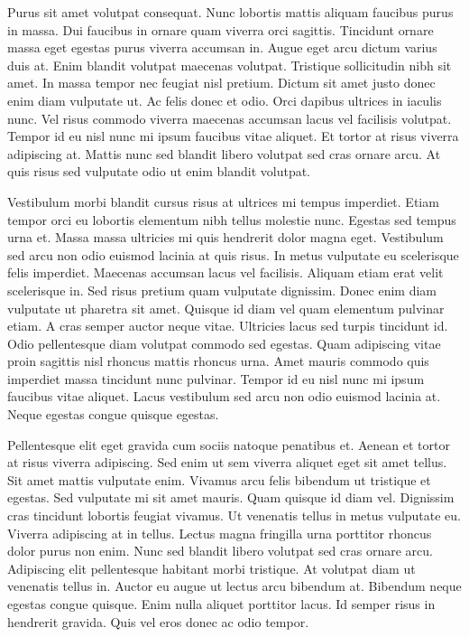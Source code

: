 \documentclass[11pt,a4paper]{article}
\begin{document}
Purus sit amet volutpat consequat. Nunc lobortis mattis aliquam faucibus purus in massa. Dui faucibus in ornare quam viverra orci sagittis. Tincidunt ornare massa eget egestas purus viverra accumsan in. Augue eget arcu dictum varius duis at. Enim blandit volutpat maecenas volutpat. Tristique sollicitudin nibh sit amet. In massa tempor nec feugiat nisl pretium. Dictum sit amet justo donec enim diam vulputate ut. Ac felis donec et odio. Orci dapibus ultrices in iaculis nunc. Vel risus commodo viverra maecenas accumsan lacus vel facilisis volutpat. Tempor id eu nisl nunc mi ipsum faucibus vitae aliquet. Et tortor at risus viverra adipiscing at. Mattis nunc sed blandit libero volutpat sed cras ornare arcu. At quis risus sed vulputate odio ut enim blandit volutpat.

Vestibulum morbi blandit cursus risus at ultrices mi tempus imperdiet. Etiam tempor orci eu lobortis elementum nibh tellus molestie nunc. Egestas sed tempus urna et. Massa massa ultricies mi quis hendrerit dolor magna eget. Vestibulum sed arcu non odio euismod lacinia at quis risus. In metus vulputate eu scelerisque felis imperdiet. Maecenas accumsan lacus vel facilisis. Aliquam etiam erat velit scelerisque in. Sed risus pretium quam vulputate dignissim. Donec enim diam vulputate ut pharetra sit amet. Quisque id diam vel quam elementum pulvinar etiam. A cras semper auctor neque vitae. Ultricies lacus sed turpis tincidunt id. Odio pellentesque diam volutpat commodo sed egestas. Quam adipiscing vitae proin sagittis nisl rhoncus mattis rhoncus urna. Amet mauris commodo quis imperdiet massa tincidunt nunc pulvinar. Tempor id eu nisl nunc mi ipsum faucibus vitae aliquet. Lacus vestibulum sed arcu non odio euismod lacinia at. Neque egestas congue quisque egestas.

Pellentesque elit eget gravida cum sociis natoque penatibus et. Aenean et tortor at risus viverra adipiscing. Sed enim ut sem viverra aliquet eget sit amet tellus. Sit amet mattis vulputate enim. Vivamus arcu felis bibendum ut tristique et egestas. Sed vulputate mi sit amet mauris. Quam quisque id diam vel. Dignissim cras tincidunt lobortis feugiat vivamus. Ut venenatis tellus in metus vulputate eu. Viverra adipiscing at in tellus. Lectus magna fringilla urna porttitor rhoncus dolor purus non enim. Nunc sed blandit libero volutpat sed cras ornare arcu. Adipiscing elit pellentesque habitant morbi tristique. At volutpat diam ut venenatis tellus in. Auctor eu augue ut lectus arcu bibendum at. Bibendum neque egestas congue quisque. Enim nulla aliquet porttitor lacus. Id semper risus in hendrerit gravida. Quis vel eros donec ac odio tempor.
\end{document}
